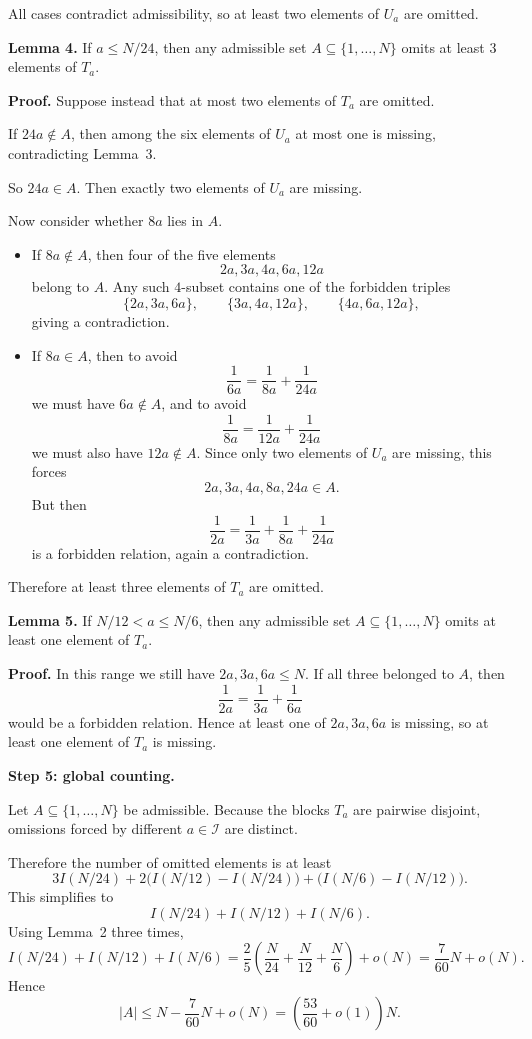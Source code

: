 All cases contradict admissibility, so at least two elements of $U_a$ are omitted.

\medskip
\noindent\textbf{Lemma 4.}
If $a\le N/24$, then any admissible set $A\subseteq \{1,\ldots,N\}$ omits at least $3$ elements of $T_a$.

\medskip
\noindent\textbf{Proof.}
Suppose instead that at most two elements of $T_a$ are omitted.

If $24a\notin A$, then among the six elements of $U_a$ at most one is missing, contradicting Lemma~3.

So $24a\in A$. Then exactly two elements of $U_a$ are missing.

Now consider whether $8a$ lies in $A$.

\begin{itemize}
\item If $8a\notin A$, then four of the five elements
\[
2a,3a,4a,6a,12a
\]
belong to $A$. Any such $4$-subset contains one of the forbidden triples
\[
\{2a,3a,6a\},\qquad \{3a,4a,12a\},\qquad \{4a,6a,12a\},
\]
giving a contradiction.
\item If $8a\in A$, then to avoid
\[
\frac1{6a}=\frac1{8a}+\frac1{24a}
\]
we must have $6a\notin A$, and to avoid
\[
\frac1{8a}=\frac1{12a}+\frac1{24a}
\]
we must also have $12a\notin A$.
Since only two elements of $U_a$ are missing, this forces
\[
2a,3a,4a,8a,24a\in A.
\]
But then
\[
\frac1{2a}=\frac1{3a}+\frac1{8a}+\frac1{24a}
\]
is a forbidden relation, again a contradiction.
\end{itemize}

Therefore at least three elements of $T_a$ are omitted.

\medskip
\noindent\textbf{Lemma 5.}
If $N/12<a\le N/6$, then any admissible set $A\subseteq \{1,\ldots,N\}$ omits at least one element of $T_a$.

\medskip
\noindent\textbf{Proof.}
In this range we still have $2a,3a,6a\le N$. If all three belonged to $A$, then
\[
\frac1{2a}=\frac1{3a}+\frac1{6a}
\]
would be a forbidden relation. Hence at least one of $2a,3a,6a$ is missing, so at least one element of $T_a$ is missing.

\medskip
\noindent\textbf{Step 5: global counting.}

Let $A\subseteq\{1,\ldots,N\}$ be admissible. Because the blocks $T_a$ are pairwise disjoint, omissions forced by different $a\in\mathcal I$ are distinct.

Therefore the number of omitted elements is at least
\[
3I(N/24)+2\bigl(I(N/12)-I(N/24)\bigr)+\bigl(I(N/6)-I(N/12)\bigr).
\]
This simplifies to
\[
I(N/24)+I(N/12)+I(N/6).
\]
Using Lemma~2 three times,
\[
I(N/24)+I(N/12)+I(N/6)
=
\frac25\left(\frac{N}{24}+\frac{N}{12}+\frac{N}{6}\right)+o(N)
=
\frac{7}{60}N+o(N).
\]
Hence
\[
|A|\le N-\frac{7}{60}N+o(N)
=
\left(\frac{53}{60}+o(1)\right)N.
\]


